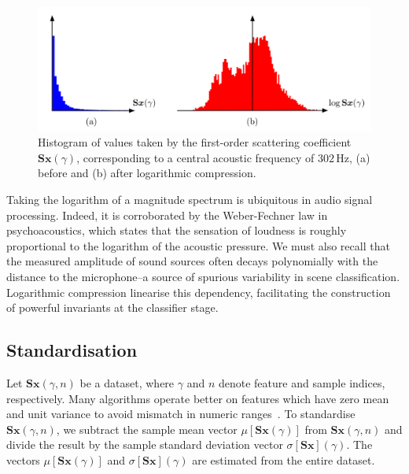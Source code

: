\documentclass[smallextended]{svjour3}
\begin{document}
\begin{figure}
\begin{center}
\includegraphics[width=\columnwidth]{figures/compression}
\caption{
\label{fig:histograms}
Histogram of values taken by the first-order scattering coefficient $\mathbf{S}\boldsymbol{x}(\gamma)$, corresponding to a central acoustic frequency of $302\,\mathrm{Hz}$,
(a) before and (b) after logarithmic compression.}
\label{fig:compression}
\end{center}
\end{figure}

Taking the logarithm of a magnitude spectrum is ubiquitous in audio signal processing.
Indeed, it is corroborated by the Weber-Fechner law in psychoacoustics, which states that the sensation of loudness is roughly proportional to the logarithm of the acoustic pressure.
We must also recall that the measured amplitude of sound sources often decays polynomially with the distance to the microphone--a source of spurious variability in scene classification.
Logarithmic compression linearise this dependency, facilitating the construction of powerful invariants at the classifier stage.

\subsection{Standardisation}
\label{sec:stand}

Let $\mathbf{S}\boldsymbol{x}(\gamma,n)$ be a dataset, where $\gamma$ and $n$ denote feature and sample indices, respectively.
Many algorithms operate better on features which have zero mean and unit variance to avoid mismatch in numeric ranges~\cite{Hsu2003}.
To standardise $\mathbf{S}\boldsymbol{x}(\gamma,n)$, we subtract the sample mean vector $\mu[\mathbf{S}\boldsymbol{x}(\gamma)]$ from $\mathbf{S}\boldsymbol{x}(\gamma,n)$ and divide the result by the sample standard deviation vector $\sigma[\mathbf{S}\boldsymbol{x}] (\gamma)$.
The vectors $\mu[\mathbf{S}\boldsymbol{x}(\gamma)]$ and $\sigma[\mathbf{S}\boldsymbol{x}](\gamma)$ are estimated from the entire dataset.
\end{document}
